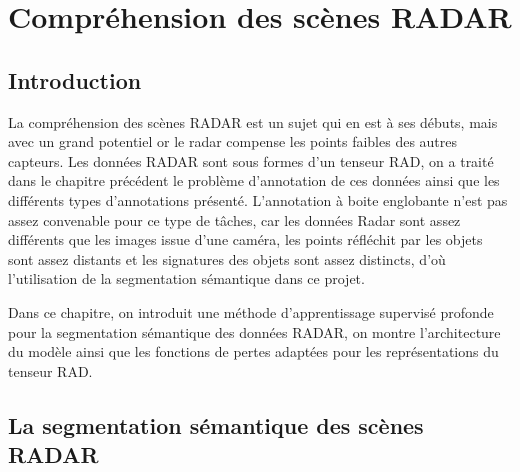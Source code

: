 \chapter{Compréhension des scènes RADAR}\label{chap:4}
\section{Introduction}
La compréhension des scènes RADAR est un sujet qui en est à ses débuts, mais avec un grand potentiel or le radar compense les points faibles des autres capteurs. Les données RADAR sont sous formes d'un tenseur RAD, on a traité dans le chapitre précédent le problème d'annotation de ces données ainsi que les différents types d'annotations présenté. L'annotation à boite englobante n'est pas assez convenable pour ce type de tâches, car les données Radar sont assez différents que les images issue d'une caméra, les points réfléchit par les objets sont assez distants et les signatures des objets sont assez distincts, d'où l'utilisation de la segmentation sémantique dans ce projet. 

Dans ce chapitre, on introduit une méthode d'apprentissage supervisé profonde pour la segmentation sémantique des données RADAR, on montre l'architecture du modèle ainsi que les fonctions de pertes adaptées pour les représentations du tenseur RAD.
\section{La segmentation sémantique des scènes RADAR}
